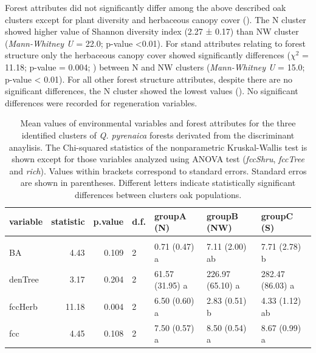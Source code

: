 Forest attributes did not significantly differ among the above described oak clusters except for plant diversity and herbaceous canopy cover (). The N cluster showed higher value of Shannon diversity index (2.27 ± 0.17) than NW cluster (\emph{Mann-Whitney U} = 22.0; p-value \textless0.01). For stand attributes relating to forest structure only the herbaceous canopy cover showed significantly differences (\(\chi^2\) = 11.18; p-value = 0.004; ) between N and NW clusters (\emph{Mann-Whitney U} = 15.0; p-value \textless{} 0.01). For all other forest structure attributes, despite there are no significant differences, the N cluster showed the lowest values (). No significant differences were recorded for regeneration variables.

\begin{table}
\caption{Mean values of environmental variables and forest attributes for the three identified clusters of \textit{Q. pyrenaica} forests derivated from the discriminant anaylisis. The Chi-squared statistics of the nonparametric Kruskal-Wallis test is shown except for those variables analyzed using ANOVA test (\textit{fccShru}, \textit{fccTree} and \textit{rich}). Values within brackets correspond to standard errors. Standard erros are shown in parentheses. Different letters indicate statistically significant differences between clusters oak populations.}\label{tab:multivar:tanovas}
\centering\begingroup\fontsize{7}{9}\selectfont
\begin{tabular}{lrrllll}
\toprule
\textbf{variable} & \textbf{statistic} & \textbf{p.value} & \textbf{d.f.} & \textbf{groupA (N)} & \textbf{groupB (NW)} & \textbf{groupC (S)}\\
\midrule
\addlinespace[0.3em]
\multicolumn{7}{l}{\textbf{Forest attributes}}\\
\hspace{1em}BA & 4.43 & 0.109 & 2 & 0.71 (0.47) a & 7.11 (2.00) ab & 7.71 (2.78) b\\
\hspace{1em}denTree & 3.17 & 0.204 & 2 & 61.57 (31.95) a & 226.97 (65.10) a & 282.47 (86.03) a\\
\hspace{1em}fccHerb & 11.18 & 0.004 & 2 & 6.50 (0.60) a & 2.83 (0.51) b & 4.33 (1.12) ab\\
\hspace{1em}fcc & 4.45 & 0.108 & 2 & 7.50 (0.57) a & 8.50 (0.54) a & 8.67 (0.99) a\\

\end{tabular}
\end{table}
